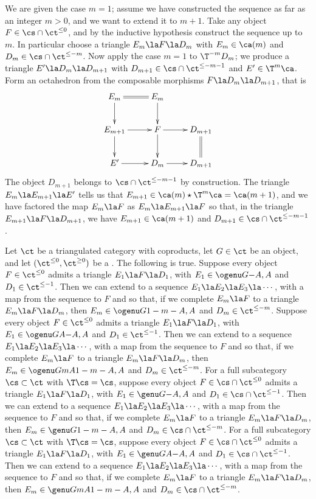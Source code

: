 \documentclass[11pt]{amsart}
\begin{document}
\prf
We are given the case $m=1$; assume we have constructed the
sequence as far as an integer $m>0$, and we want to extend it to $m+1$.
Take
any object $F\in\cs\cap\ct^{\leq0}$, and by the inductive hypothesis
construct the sequence up to $m$. In particular
choose a triangle $E_m\la F\la D_m$ with
$E_m\in\ca(m)$ and $D_m\in\cs\cap\ct^{\leq-m}$.
Now apply the case $m=1$ to $\T^{-m}D_m$; we produce
a triangle $E'\la D_m\la D_{m+1}$ with 
$D_{m+1}\in\cs\cap\ct^{\leq-m-1}$ and
$E'\in\T^m\ca$.
Form an octahedron from the
composable morphisms $F\la D_m\la D_{m+1}$, that is
\[\xymatrix{
E_m\ar[d] \ar@{=}[r] & E_m\ar[d] & \\
E_{m+1}\ar[d]  \ar[r] & F\ar[d]\ar[r] & D_{m+1}\ar@{=}[d]\\
E' \ar[r] & D_m\ar[r] & D_{m+1}
}\]
The object $D_{m+1}$ belongs to $\cs\cap\ct^{\leq-m-1}$ by construction.
The triangle $E_m\la E_{m+1}\la E'$ tells us that
$E_{m+1}\in\ca(m)\star\T^m\ca=\ca(m+1)$, and we have factored the map
$E_m\la F$ as $E_m\la E_{m+1}\la F$ so that, in the triangle
$E_{m+1}\la F\la D_{m+1}$, we have $E_{m+1}\in\ca(m+1)$ and
$D_{m+1}\in\cs\cap\ct^{\leq-m-1}$.
\eprf

Let $\ct$ be a triangulated category with coproducts, let $G\in\ct$
be an object, and let $(\ct^{\leq0},\ct^{\geq0})$ be a \tstr. The following
is true.
Suppose every object $F\in\ct^{\leq0}$ admits a triangle $E_1\la F\la D_1$,
with $E_1\in\ogenu G{}{-A,A}$ and $D_1\in\ct^{\leq-1}$. Then
we can extend to a sequence $E_1\la E_2\la E_3\la\cdots$, with a
map from the sequence to $F$ and so that, if we complete $E_m\la F$
to a triangle $E_m\la F\la D_m$,
then $E_m\in\ogenu G{}{1-m-A,A}$ and $D_m\in\ct^{\leq-m}$.
\esthm
{}
Suppose every object $F\in\ct^{\leq0}$ admits a triangle $E_1\la F\la D_1$,
with $E_1\in\ogenu G{A}{-A,A}$ and $D_1\in\ct^{\leq-1}$.
Then
we can extend to a sequence $E_1\la E_2\la E_3\la\cdots$, with a
map from the sequence to $F$ and so that, if we complete $E_m\la F$
to a triangle $E_m\la F\la D_m$,
then $E_m\in\ogenu G{mA}{1-m-A,A}$ and $D_m\in\ct^{\leq-m}$.
\esthm
{}
For a full subcategory $\cs\subset\ct$ with $\T\cs=\cs$,
suppose every object $F\in\cs\cap\ct^{\leq0}$ admits a triangle $E_1\la F\la D_1$,
with $E_1\in\genu G{}{-A,A}$ and $D_1\in\cs\cap\ct^{\leq-1}$.
 Then
we can extend to a sequence $E_1\la E_2\la E_3\la\cdots$, with a
map from the sequence to $F$ and so that, if we complete $E_m\la F$
to a triangle $E_m\la F\la D_m$,
then $E_m\in\genu G{}{1-m-A,A}$ and $D_m\in\cs\cap\ct^{\leq-m}$.
\esthm
{}
For a full subcategory $\cs\subset\ct$ with $\T\cs=\cs$,
suppose every object $F\in\cs\cap\ct^{\leq0}$ admits a triangle $E_1\la F\la D_1$,
with $E_1\in\genu G{A}{-A,A}$ and $D_1\in\cs\cap\ct^{\leq-1}$.
 Then
we can extend to a sequence $E_1\la E_2\la E_3\la\cdots$, with a
map from the sequence to $F$ and so that, if we complete $E_m\la F$
to a triangle $E_m\la F\la D_m$,
then $E_m\in\genu G{mA}{1-m-A,A}$ and $D_m\in\cs\cap\ct^{\leq-m}$.
\esthm
\ecor
\end{document}
